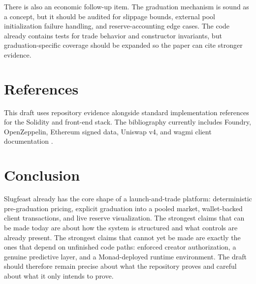 \documentclass[10pt,letterpaper]{article}
\begin{document}
There is also an economic follow-up item. The graduation mechanism is sound as a concept, but it should be audited for slippage bounds, external pool initialization failure handling, and reserve-accounting edge cases. The code already contains tests for trade behavior and constructor invariants, but graduation-specific coverage should be expanded so the paper can cite stronger evidence.

\section{References}
This draft uses repository evidence alongside standard implementation references for the Solidity and front-end stack. The bibliography currently includes Foundry, OpenZeppelin, Ethereum signed data, Uniswap v4, and wagmi client documentation \citep{FoundryDocs, OpenZeppelinContracts, EIP191, UniswapV4Docs, WagmiDocs}.

\printbibliography[heading=none]

\section{Conclusion}
Slugfeast already has the core shape of a launch-and-trade platform: deterministic pre-graduation pricing, explicit graduation into a pooled market, wallet-backed client transactions, and live reserve visualization. The strongest claims that can be made today are about how the system is structured and what controls are already present. The strongest claims that cannot yet be made are exactly the ones that depend on unfinished code paths: enforced creator authorization, a genuine predictive layer, and a Monad-deployed runtime environment. The draft should therefore remain precise about what the repository proves and careful about what it only intends to prove.
\end{document}
